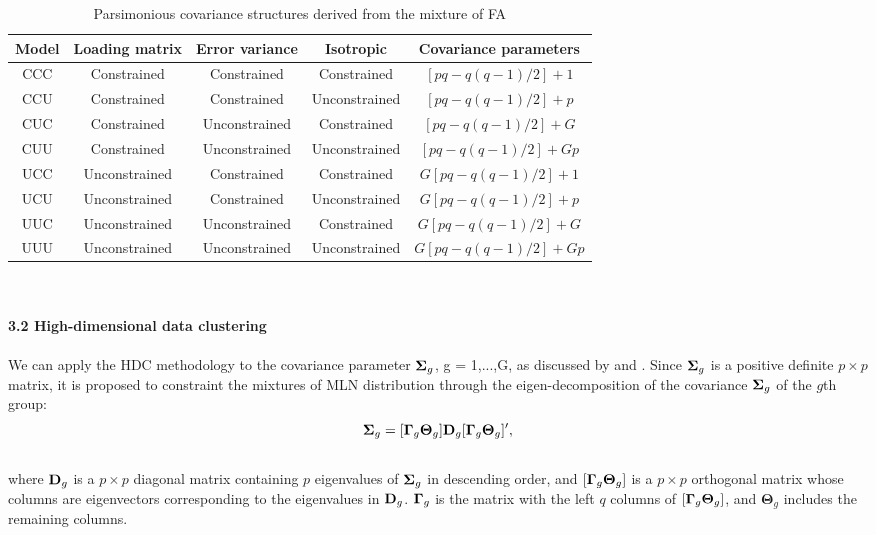 \documentclass[11pt]{article}
\begin{document}
\begin {table}
\caption {Parsimonious covariance structures derived from the mixture of FA} \label{tab:title} 
\def\arraystretch{1.2}
\begin{center}
\begin{tabular}{ |c|c|c|c|c| } 
\hline
Model & Loading matrix & Error variance & Isotropic & Covariance parameters \\
\hline
CCC & Constrained & Constrained & Constrained & $[pq - q(q -1)/2]+1$ \\ 
CCU & Constrained & Constrained & Unconstrained & $[pq - q(q -1)/2]+p$ \\ 
CUC & Constrained & Unconstrained & Constrained & $[pq - q(q -1)/2]+G$ \\ 
CUU & Constrained & Unconstrained & Unconstrained & $[pq - q(q -1)/2]+Gp$ \\ 
UCC & Unconstrained & Constrained & Constrained & $G[pq - q(q -1)/2]+1$ \\ 
UCU & Unconstrained & Constrained & Unconstrained & $G[pq - q(q -1)/2]+p$ \\ 
UUC & Unconstrained & Unconstrained & Constrained & $G[pq - q(q -1)/2]+G$ \\ 
UUU & Unconstrained & Unconstrained & Unconstrained & $G[pq -q(q-1)/2]+Gp$ \\ 
\hline
\end{tabular}
\end{center}
\end {table}\\
\\
\textbf{3.2 High-dimensional data clustering}\\
\\
We can apply the HDC methodology to the covariance parameter $\bold{\Sigma}_g$, g = 1,...,G, as discussed by \citet{bouveyron2007high} and \citet{kim2019subspace}. Since $\bold{\Sigma}_g$ is a positive definite $p \times p$ matrix, it is proposed to constraint the mixtures of MLN distribution through the eigen-decomposition of the covariance $\bold{\Sigma}_g$ of the $g$th group:
\\
$$\bold{\Sigma}_g = [\bold{\Gamma}_g\bold{\Theta}_g]\bold{D}_g[\bold{\Gamma}_g\bold{\Theta}_g]',$$ 
\\
where $\bold{D}_g$ is a ${p\times p}$ diagonal matrix containing $p$ eigenvalues of $\bold{\Sigma}_g$ in descending order, and $[\bold{\Gamma}_g\bold{\Theta}_g]$ is a ${p\times p}$ orthogonal matrix whose columns are eigenvectors corresponding to the eigenvalues in $\bold{D}_g$. $\bold{\Gamma}_g$ is the matrix with the left $q$ columns of $[\bold{\Gamma}_g\bold{\Theta}_g]$, and $\boldsymbol{\Theta}_g$ includes the remaining columns.\\
\end{document}

